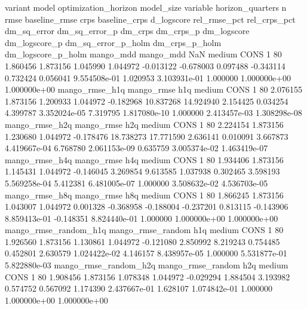               variant             model optimization_horizon model_size variable  horizon_quarters  n      rmse  baseline_rmse     crps  baseline_crps  d_logscore  rel_rmse_pct  rel_crps_pct  dm_sq_error  dm_sq_error_p   dm_crps    dm_crps_p  dm_logscore  dm_logscore_p  dm_sq_error_p_holm  dm_crps_p_holm  dm_logscore_p_holm
            mango_mdd         mango_mdd                  NaN     medium     CONS                 1 80  1.860456       1.873156 1.045990       1.044972   -0.013122     -0.678003      0.097488    -0.343114       0.732424  0.056041 9.554508e-01     1.020953   3.103931e-01            1.000000    1.000000e+00        1.000000e+00
       mango_rmse_h1q        mango_rmse                  h1q     medium     CONS                 1 80  2.076155       1.873156 1.200933       1.044972   -0.182968     10.837268     14.924940     2.154425       0.034254  4.399787 3.352024e-05     7.319795   1.817080e-10            1.000000    2.413457e-03        1.308298e-08
       mango_rmse_h2q        mango_rmse                  h2q     medium     CONS                 1 80  2.224154       1.873156 1.230680       1.044972   -0.178476     18.738273     17.771590     2.636141       0.010091  3.667873 4.419667e-04     6.768780   2.061153e-09            0.635759    3.005374e-02        1.463419e-07
       mango_rmse_h4q        mango_rmse                  h4q     medium     CONS                 1 80  1.934406       1.873156 1.145431       1.044972   -0.146045      3.269854      9.613585     1.037938       0.302465  3.598193 5.569258e-04     5.412381   6.481005e-07            1.000000    3.508632e-02        4.536703e-05
       mango_rmse_h8q        mango_rmse                  h8q     medium     CONS                 1 80  1.866245       1.873156 1.043007       1.044972    0.001328     -0.368958     -0.188004    -0.237201       0.813115 -0.143906 8.859413e-01    -0.148351   8.824440e-01            1.000000    1.000000e+00        1.000000e+00
mango_rmse_random_h1q mango_rmse_random                  h1q     medium     CONS                 1 80  1.926560       1.873156 1.130861       1.044972   -0.121080      2.850992      8.219243     0.754485       0.452801  2.630579 1.024422e-02     4.146157   8.438957e-05            1.000000    5.531877e-01        5.822880e-03
mango_rmse_random_h2q mango_rmse_random                  h2q     medium     CONS                 1 80  1.908456       1.873156 1.078348       1.044972   -0.029294      1.884504      3.193982     0.574752       0.567092  1.174390 2.437667e-01     1.628107   1.074842e-01            1.000000    1.000000e+00        1.000000e+00
